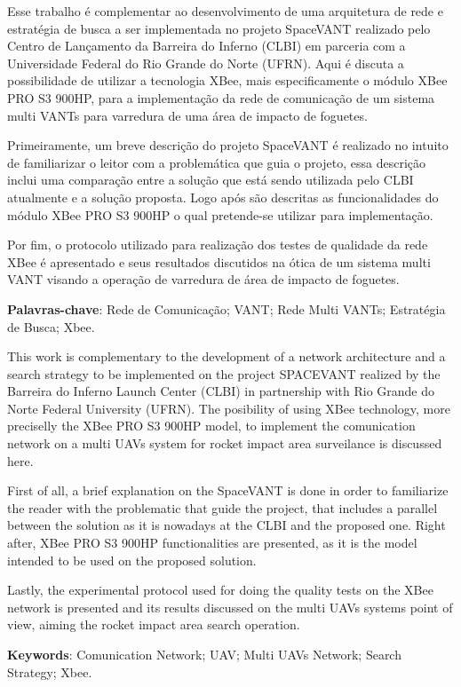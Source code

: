 

Esse trabalho é complementar ao desenvolvimento de uma arquitetura de rede e estratégia de busca a ser implementada no projeto SpaceVANT realizado pelo Centro de Lançamento da Barreira do Inferno (CLBI) em parceria com a Universidade Federal do Rio Grande do Norte (UFRN). Aqui é discuta a possibilidade de utilizar a tecnologia XBee, mais especificamente o módulo XBee PRO S3 900HP, para a implementação da rede de comunicação de um sistema multi VANTs para varredura de uma área de impacto de foguetes. 

Primeiramente, um breve descrição do projeto SpaceVANT é realizado no intuito de familiarizar o leitor com a problemática que guia o projeto, essa descrição inclui uma comparação entre a solução que está sendo utilizada pelo CLBI atualmente e a solução proposta. Logo após são descritas as funcionalidades do módulo XBee PRO S3 900HP o qual pretende-se utilizar para implementação.

Por fim, o protocolo utilizado para realização dos testes de qualidade da rede XBee é apresentado e seus resultados discutidos na ótica de um sistema multi VANT visando a operação de varredura de área de impacto de foguetes. 
 
\textbf{Palavras-chave}: Rede de Comunicação; VANT; Rede Multi VANTs; Estratégia de Busca; Xbee.


This work is complementary to the development of a network architecture and a search strategy to be implemented on the project SPACEVANT realized by the Barreira do Inferno Launch Center (CLBI) in partnership with Rio Grande do Norte Federal University (UFRN). The posibility of using XBee technology, more preciselly the XBee PRO S3 900HP model, to implement the comunication network on a multi UAVs system for rocket impact area surveilance is discussed here. 

First of all, a brief explanation on the SpaceVANT is done in order to familiarize the reader with the problematic that guide the project, that includes a parallel between the solution as it is nowadays at the CLBI and the proposed one. Right after, XBee PRO S3 900HP functionalities are presented, as it is the model intended to be used on the proposed solution.

Lastly, the experimental protocol used for doing the quality tests on the XBee network is presented and its results discussed on the multi UAVs systems point of view, aiming the rocket impact area search operation.   



\textbf{Keywords}: Comunication Network; UAV; Multi UAVs Network; Search Strategy; Xbee.